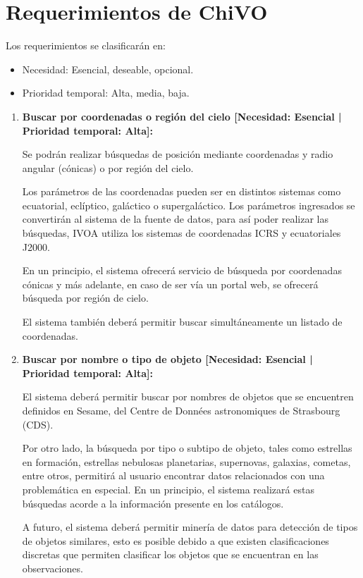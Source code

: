 \section{Requerimientos de ChiVO}

Los requerimientos se clasificarán en:
\begin{itemize}
	\item Necesidad: Esencial, deseable, opcional.
	\item Prioridad temporal: Alta, media, baja.
\end{itemize}

\begin{enumerate}
	\item \textbf{Buscar por coordenadas o región del cielo [Necesidad:
Esencial | Prioridad temporal: Alta]:}

Se podrán realizar búsquedas de posición mediante coordenadas y radio angular
(cónicas) o por región del cielo.

Los parámetros de las coordenadas pueden ser en distintos sistemas como
ecuatorial, eclíptico, galáctico o supergaláctico. Los parámetros ingresados se
convertirán al sistema de la fuente de datos, para así poder realizar las
búsquedas, IVOA utiliza los sistemas de coordenadas ICRS y ecuatoriales J2000.

En un principio, el sistema ofrecerá servicio de búsqueda por coordenadas
cónicas y más adelante, en caso de ser vía un portal web, se ofrecerá búsqueda
por región de cielo.

El sistema también deberá permitir buscar simultáneamente un listado de
coordenadas.

	\item \textbf{Buscar por nombre o tipo de objeto [Necesidad: Esencial |
Prioridad temporal: Alta]:}

El sistema deberá permitir buscar por nombres de objetos que se encuentren
definidos en Sesame, del Centre de Données astronomiques de Strasbourg (CDS).

Por otro lado, la búsqueda por tipo o subtipo de objeto, tales como estrellas
en formación, estrellas nebulosas planetarias, supernovas, galaxias, cometas,
entre otros, permitirá al usuario encontrar datos relacionados con una
problemática en especial. En un principio, el sistema realizará estas búsquedas
acorde a la información presente en los catálogos.

A futuro, el sistema deberá permitir minería de datos para detección de tipos
de objetos similares, esto es posible debido a que existen clasificaciones
discretas que permiten clasificar los objetos que se encuentran en las
observaciones.


\end{enumerate}
